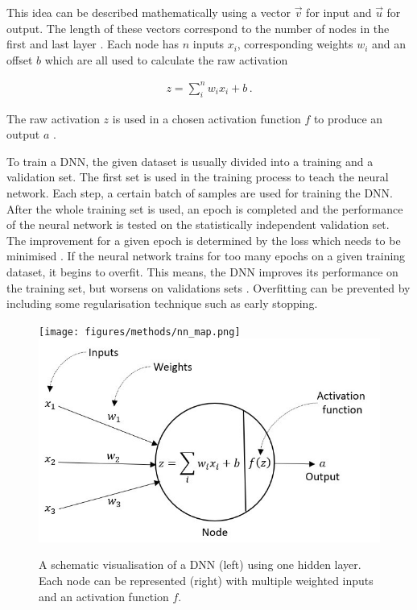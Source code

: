 \documentclass[bachelor,ngerman,english]{GAUBM}
\begin{document}
This idea can be described mathematically using a vector $\vec{v}$ for input and $\vec{u}$ for output. The length of these vectors correspond to the number of nodes in the first and last layer \cite{nn:node_calculation}. Each node has $n$ inputs $x_i$, corresponding weights $w_i$ and an offset $b$ which are all used to calculate the raw activation

\begin{align}
	z = \sum_i^n w_ix_i + b\,.
\end{align}

The raw activation $z$ is used in a chosen activation function $f$ to produce an output $a$ \cite{nn:node_calculation}. %

To train a DNN, the given dataset is usually divided into a training and a validation set. The first set is used in the training process to teach the neural network. Each step, a certain batch of samples are used for training the DNN. After the whole training set is used, an epoch is completed and the performance of the neural network is tested on the statistically independent validation set. The improvement for a given epoch is determined by the loss which needs to be minimised \cite{nn:overfitting}. If the neural network trains for too many epochs on a given training dataset, it begins to overfit. This means, the DNN improves its performance on the training set, but worsens on validations sets \cite{nn:overfitting}. Overfitting can be prevented by including some regularisation technique such as early stopping. 

\begin{figure}[t]
	\centering
	\texttt{[image: figures/methods/nn\_map.png]}\hfill
	\includegraphics[width=.47\textwidth]{figures/methods/nn_node.png}
	\caption{A schematic visualisation of a DNN (left) using one hidden layer. Each node can be represented (right) with multiple weighted inputs and an activation function $f$.}
	\label{fig:neural_networks}
\end{figure}
\end{document}
